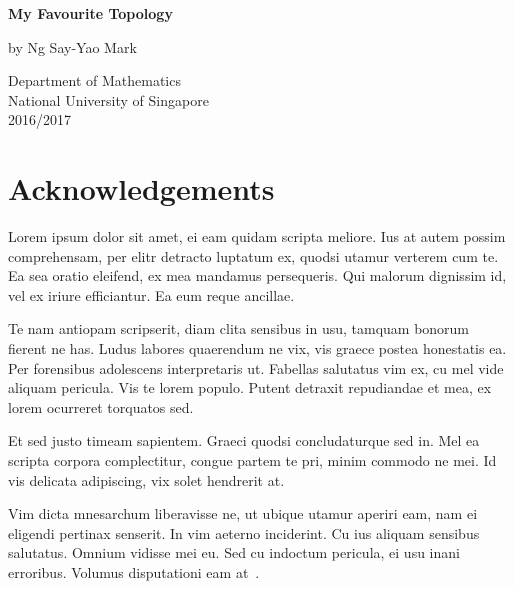 \documentclass[12pt, a4paper]{article}
\theoremstyle{definition}
\theoremstyle{remark}
\numberwithin{equation}{section}
\numberwithin{figure}{section}
\numberwithin{table}{section}
\begin{document}
    \begin{titlepage}
        \begin{center}
            \vspace*{1cm}

            \LARGE
            \textbf{My Favourite Topology}

            \vspace{0.5cm}

            \large
            by Ng Say-Yao Mark

            \vspace{1.5cm}

            \vfill

            \vspace{1.0cm}

            Department of Mathematics\\
            National University of Singapore\\
            2016/2017
        \end{center}
    \end{titlepage}
    \section*{Acknowledgements}
        Lorem ipsum dolor sit amet, ei eam quidam scripta meliore. Ius at autem possim comprehensam, per elitr detracto luptatum ex, quodsi utamur verterem cum te. Ea sea oratio eleifend, ex mea mandamus persequeris. Qui malorum dignissim id, vel ex iriure efficiantur. Ea eum reque ancillae.

        Te nam antiopam scripserit, diam clita sensibus in usu, tamquam bonorum fierent ne has. Ludus labores quaerendum ne vix, vis graece postea honestatis ea. Per forensibus adolescens interpretaris ut. Fabellas salutatus vim ex, cu mel vide aliquam pericula. Vis te lorem populo. Putent detraxit repudiandae et mea, ex lorem ocurreret torquatos sed.

        Et sed justo timeam sapientem. Graeci quodsi concludaturque sed in. Mel ea scripta corpora complectitur, congue partem te pri, minim commodo ne mei. Id vis delicata adipiscing, vix solet hendrerit at.

        Vim dicta mnesarchum liberavisse ne, ut ubique utamur aperiri eam, nam ei eligendi pertinax senserit. In vim aeterno inciderint. Cu ius aliquam sensibus salutatus. Omnium vidisse mei eu. Sed cu indoctum pericula, ei usu inani erroribus. Volumus disputationi eam at~\cite{munkres-topology,a-taste-of-topology,algebraic-topology,elements-of-algebraic-topology,graphs-surfaces-homology,lectures-alg-topology,topology-and-its-applications}.
\end{document}
